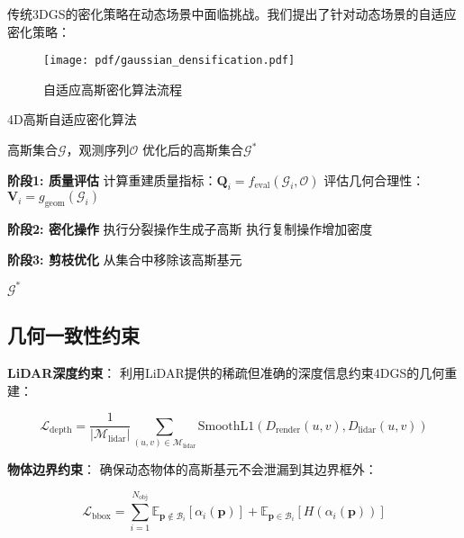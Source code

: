 传统3DGS的密化策略在动态场景中面临挑战。我们提出了针对动态场景的自适应密化策略：

\begin{figure}[htbp]
  \centering
  \texttt{[image: pdf/gaussian\_densification.pdf]}
  \caption{自适应高斯密化算法流程}
  \label{fig:gaussian-densification}
\end{figure}

\begin{algorithm}
\caption{4D高斯自适应密化算法}
\label{alg:adaptive_densification}
\begin{algorithmic}[1]
\REQUIRE 高斯集合$\mathcal{G}$，观测序列$\mathcal{O}$
\ENSURE 优化后的高斯集合$\mathcal{G}^*$

\STATE \textbf{阶段1: 质量评估}
    \STATE 计算重建质量指标：$\mathbf{Q}_i = f_{\text{eval}}(\mathcal{G}_i, \mathcal{O})$
    \STATE 评估几何合理性：$\mathbf{V}_i = g_{\text{geom}}(\mathcal{G}_i)$
\ENDFOR

\STATE \textbf{阶段2: 密化操作}
            \STATE 执行分裂操作生成子高斯
        \ELSE
            \STATE 执行复制操作增加密度
        \ENDIF
    \ENDIF
\ENDFOR

\STATE \textbf{阶段3: 剪枝优化}
        \STATE 从集合中移除该高斯基元
    \ENDIF
\ENDFOR

\RETURN $\mathcal{G}^*$
\end{algorithmic}
\end{algorithm}

\subsection{几何一致性约束}

\textbf{LiDAR深度约束}：
利用LiDAR提供的稀疏但准确的深度信息约束4DGS的几何重建：

\begin{equation}
\mathcal{L}_{\text{depth}} = \frac{1}{|\mathcal{M}_{\text{lidar}}|} \sum_{(u,v) \in \mathcal{M}_{\text{lidar}}} \text{SmoothL1}(D_{\text{render}}(u,v), D_{\text{lidar}}(u,v))
\label{eq:lidar_depth_constraint}
\end{equation}

\textbf{物体边界约束}：
确保动态物体的高斯基元不会泄漏到其边界框外：

\begin{equation}
\mathcal{L}_{\text{bbox}} = \sum_{i=1}^{N_{\text{obj}}} \mathbb{E}_{\mathbf{p} \notin \mathcal{B}_i} [\alpha_i(\mathbf{p})] + \mathbb{E}_{\mathbf{p} \in \mathcal{B}_i} [H(\alpha_i(\mathbf{p}))]
\label{eq:bbox_constraint}
\end{equation}

